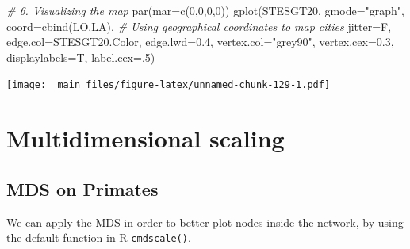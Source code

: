 \documentclass[
  notitlepage,
  onecolumn,
  openany]{book}
\newenvironment{Shaded}{\begin{snugshade}}{\end{snugshade}}
\newcommand{\AttributeTok}[1]{\textcolor[rgb]{0.77,0.63,0.00}{#1}}
\newcommand{\CommentTok}[1]{\textcolor[rgb]{0.56,0.35,0.01}{\textit{#1}}}
\newcommand{\DecValTok}[1]{\textcolor[rgb]{0.00,0.00,0.81}{#1}}
\newcommand{\FloatTok}[1]{\textcolor[rgb]{0.00,0.00,0.81}{#1}}
\newcommand{\FunctionTok}[1]{\textcolor[rgb]{0.00,0.00,0.00}{#1}}
\newcommand{\NormalTok}[1]{#1}
\newcommand{\StringTok}[1]{\textcolor[rgb]{0.31,0.60,0.02}{#1}}
\begin{document}
\begin{Shaded}
\begin{Highlighting}[]
\CommentTok{\# 6. Visualizing the map}
\FunctionTok{par}\NormalTok{(}\AttributeTok{mar=}\FunctionTok{c}\NormalTok{(}\DecValTok{0}\NormalTok{,}\DecValTok{0}\NormalTok{,}\DecValTok{0}\NormalTok{,}\DecValTok{0}\NormalTok{))}
\FunctionTok{gplot}\NormalTok{(STESGT20, }
      \AttributeTok{gmode=}\StringTok{"graph"}\NormalTok{,}
      \AttributeTok{coord=}\FunctionTok{cbind}\NormalTok{(LO,LA), }\CommentTok{\# Using geographical coordinates to map cities}
      \AttributeTok{jitter=}\NormalTok{F,}
      \AttributeTok{edge.col=}\NormalTok{STESGT20.Color,}
      \AttributeTok{edge.lwd=}\FloatTok{0.4}\NormalTok{,}
      \AttributeTok{vertex.col=}\StringTok{"grey90"}\NormalTok{,}
      \AttributeTok{vertex.cex=}\FloatTok{0.3}\NormalTok{,}
      \AttributeTok{displaylabels=}\NormalTok{T, }
      \AttributeTok{label.cex=}\NormalTok{.}\DecValTok{5}\NormalTok{)}
\end{Highlighting}
\end{Shaded}

\texttt{[image: \_main\_files/figure-latex/unnamed-chunk-129-1.pdf]}

\hypertarget{multidimensional-scaling}{%
\section{Multidimensional scaling}\label{multidimensional-scaling}}

\hypertarget{mds-on-primates}{%
\subsection{MDS on Primates}\label{mds-on-primates}}

We can apply the MDS in order to better plot nodes inside the network, by using the default function in R \texttt{cmdscale()}.
\end{document}
